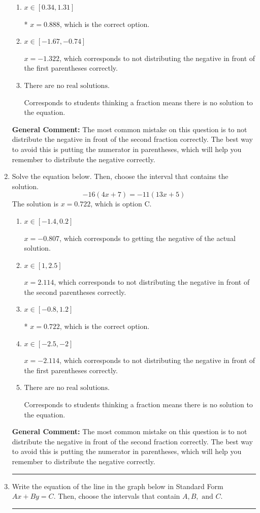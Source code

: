 \documentclass{extbook}[14pt]
\newcommand{\litem}[1]{\item #1

\rule{\textwidth}{0.4pt}}
\begin{document}
\begin{enumerate}
{\begin{enumerate}[label=\Alph*.]
$x = 1.322$, which corresponds to not distributing the negative in front of the second parentheses correctly.
\item \( x \in [0.34, 1.31] \)

* $x = 0.888$, which is the correct option.
\item \( x \in [-1.67, -0.74] \)

$x = -1.322$, which corresponds to not distributing the negative in front of the first parentheses correctly.
\item \( \text{There are no real solutions.} \)

Corresponds to students thinking a fraction means there is no solution to the equation.
\end{enumerate}

\textbf{General Comment:} The most common mistake on this question is to not distribute the negative in front of the second fraction correctly. The best way to avoid this is putting the numerator in parentheses, which will help you remember to distribute the negative correctly.
}
\litem{
Solve the equation below. Then, choose the interval that contains the solution.
\[ -16(4x + 7) = -11(13x + 5) \]The solution is \( x = 0.722 \), which is option C.\begin{enumerate}[label=\Alph*.]
\item \( x \in [-1.4, 0.2] \)

$x = -0.807$, which corresponds to getting the negative of the actual solution.
\item \( x \in [1, 2.5] \)

$x = 2.114$, which corresponds to not distributing the negative in front of the second parentheses correctly.
\item \( x \in [-0.8, 1.2] \)

* $x = 0.722$, which is the correct option.
\item \( x \in [-2.5, -2] \)

$x = -2.114$, which corresponds to not distributing the negative in front of the first parentheses correctly.
\item \( \text{There are no real solutions.} \)

Corresponds to students thinking a fraction means there is no solution to the equation.
\end{enumerate}

\textbf{General Comment:} The most common mistake on this question is to not distribute the negative in front of the second fraction correctly. The best way to avoid this is putting the numerator in parentheses, which will help you remember to distribute the negative correctly.
}
\litem{
Write the equation of the line in the graph below in Standard Form $Ax+By=C$. Then, choose the intervals that contain $A, B, \text{ and } C$.

}
\end{enumerate}
\end{document}

